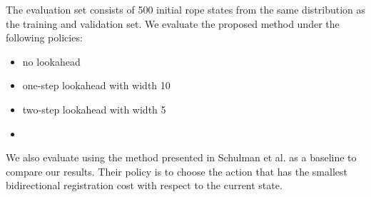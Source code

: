 The evaluation set consists of 500 initial rope states from the same distribution as the training and validation set.
We evaluate the proposed method under the following policies:
\begin{itemize}
  \item no lookahead
  \item one-step lookahead with width 10
  \item two-step lookahead with width 5
  \item {}
\end{itemize}
We also evaluate using the method presented in Schulman et al. as a baseline to compare our results. Their policy is to choose the action that has the smallest bidirectional registration cost with respect to the current state.


